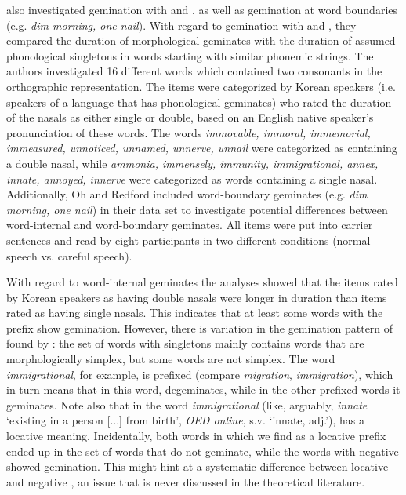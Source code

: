\cite{Oh.2012} also investigated gemination with  and , as well as gemination at word boundaries  (e.g. \textit{dim morning, one nail}). With regard to gemination with  and , they compared the duration of morphological geminates with the duration of assumed phonological singletons in words starting with similar phonemic strings. The authors investigated 16 different words which contained two consonants in the orthographic representation.  The items were categorized  by Korean speakers (i.e. speakers of a language that has phonological geminates) who rated the duration of the nasals as either single or double, based on an English native speaker’s pronunciation of these words. The words \textit{immovable, immoral, immemorial, immeasured, unnoticed, unnamed, unnerve, unnail} were categorized as containing a double nasal, while \textit{ammonia, immensely, immunity, immigrational, annex, innate, annoyed, innerve} were categorized as words containing a single nasal. 
Additionally, Oh and Redford included word-boundary geminates (e.g. \textit{dim morning, one nail}) in their data set to investigate potential differences between word-internal and word-boundary geminates. All items were put into carrier sentences and read by eight participants in two different conditions (normal speech vs. careful speech). 

With regard to word-internal geminates the analyses showed that the items rated by Korean speakers as having double nasals were longer in duration than items rated as having single nasals. This indicates that at least some words with the prefix  show gemination.
However, there is variation in the gemination pattern of  found by \cite{Oh.2012}: the set of words with singletons mainly contains words that are morphologically simplex, but some words are not simplex. The word \textit{immigrational}, for example, is prefixed (compare \textit{migration}, \textit{immigration}), which in turn means that in this word,  degeminates, while in the other prefixed words it geminates. Note also that  in the word \textit{immigrational} (like, arguably, \textit{innate} `existing in a person [...] from birth', \textit{OED online}\nocite{OED.2013}, s.v. `innate, adj.'), has a locative meaning. Incidentally, both words in which we find  as a locative prefix ended up in the set of words that do not geminate, while the words with negative  showed gemination. This might hint at a systematic difference between locative and negative , an issue that is never discussed in the theoretical literature.

